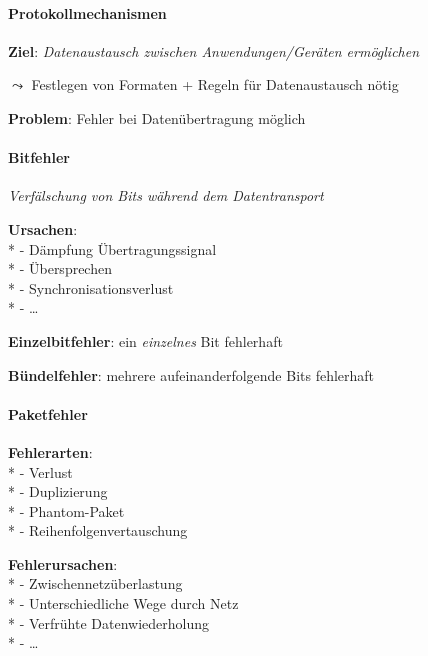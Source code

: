 \paragraph{Protokollmechanismen}
\begin{items}
  \item \textbf{Ziel}: \emph{Datenaustausch zwischen Anwendungen/Geräten ermöglichen}
  \item \( \leadsto \) Festlegen von Formaten + Regeln für Datenaustausch nötig
  \item \textbf{Problem}: Fehler bei Datenübertragung möglich
\end{items}

\paragraph{Bitfehler}
\begin{items}
  \item \emph{Verfälschung von Bits während dem Datentransport}
  \item \textbf{Ursachen}: \\*
    - Dämpfung Übertragungssignal \\*
    - Übersprechen \\*
    - Synchronisationsverlust \\*
    - \dots
  \item \textbf{Einzelbitfehler}: ein \emph{einzelnes} Bit fehlerhaft
  \item \textbf{Bündelfehler}: mehrere aufeinanderfolgende Bits fehlerhaft
\end{items}

\paragraph{Paketfehler}
\begin{items}
  \item \textbf{Fehlerarten}: \\*
    - Verlust \\*
    - Duplizierung \\*
    - Phantom-Paket \\*
    - Reihenfolgenvertauschung
  \item \textbf{Fehlerursachen}: \\*
    - Zwischennetzüberlastung \\*
    - Unterschiedliche Wege durch Netz \\*
    - Verfrühte Datenwiederholung \\*
    - \dots
\end{items}


